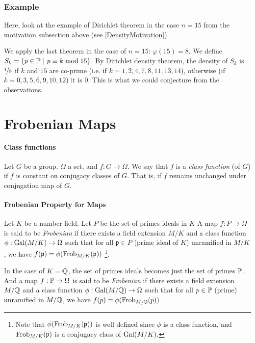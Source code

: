 \subsubsection{Example}
Here, look at the example of Dirichlet theorem in the case $n=15$ from the motivation subsection above (see \ref{DensityMotivation}).

We apply the last theorem in the case of $n=15$: $\varphi(15)=8$.
We define $S_k = \{ p \in \mathbb{P} \ | \ p \equiv k \bmod 15 \}$.
By Dirichlet density theorem,  the density of $S_k$ is $\nicefrac{1}{8}$ if $k$ and $15$ are co-prime (i.e. if $k = 1,2,4,7,8,11,13,14$), otherwise (if $k=0,3,5,6,9,10,12$) it is $0$.
This is what we could conjecture from the observations.

\section{Frobenian Maps}
\paragraph{Class functions}
Let $G$ be a group, $\Omega$ a set, and $f: G \to \Omega$.
We say that $f$ is a \textit{class function} (of $G$) if $f$ is constant on conjugacy classes of $G$.
That is, if $f$ remains unchanged under conjugation map of $G$.

\paragraph{Frobenian Property for Maps}
Let $K$ be a number field. Let $P$ be the set of primes ideals in $K$
A map $f: P \to \Omega$ is said to be \textit{Frobenian} if there exists a field extension $M/K$ and a class function $\phi:\text{Gal}(M/K) \to \Omega$ such that for all $\mathfrak{p} \in P$ (prime ideal of $K$) unramified in $M/K$, we have $f(\mathfrak{p})=\phi(\text{Frob}_{M/K}(\mathfrak{p}))$
\footnote{Note that $\phi(\text{Frob}_{M/K}(\mathfrak{p}))$ is well defined since $\phi$ is a class function, and $\text{Frob}_{M/K}(\mathfrak{p})$ is a conjugacy class of $\text{Gal}(M/K)$.}.

In the case of $K=\mathbb{Q}$, the set of primes ideals becomes just the set of primes $\mathbb{P}$.
And a map $f: \mathbb{P} \to \Omega$ is said to be \textit{Frobenian} if there exists a field extension $M/\mathbb{Q}$ and a class function $\phi:\text{Gal}(M/\mathbb{Q}) \to \Omega$ such that for all $p \in \mathbb{P}$ (prime) unramified in $M/\mathbb{Q}$, we have $f(p)=\phi(\text{Frob}_{M/\mathbb{Q}}(p))$.

